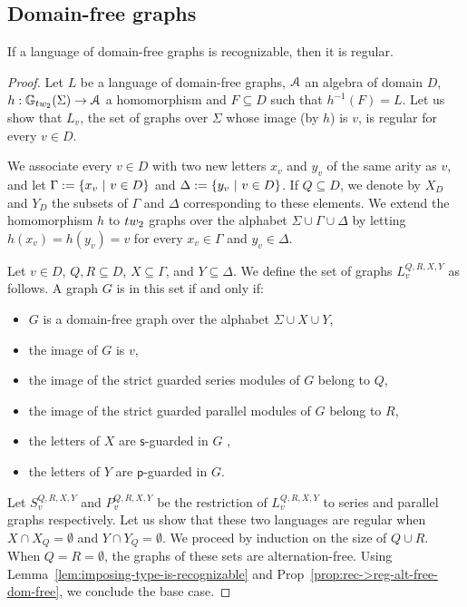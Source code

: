 \subsection{Domain-free graphs}
 



\begin{proposition}\label{prop:rec->reg-dom-free}
If a language of domain-free graphs is recognizable, then it is regular.
\end{proposition}
\begin{proof}
Let $L$ be a language of domain-free graphs, $\mathcal A$ an algebra of domain $D$, $h:\mathbb{G}_\TWT(\Sigma) \to \A$ a homomorphism and $F\subseteq D$ such that $h^{-1}(F)=L$. Let us show that $L_v$, the set of graphs over $\Sigma$ whose image (by $h$) is $v$,  is regular for every $v\in D$. 
\medskip

We associate every $v\in D$ with two new letters $x_v$ and $y_v$ of the same arity as $v$, and let  $\Gamma:=\left\{x_v\ | \ v\in D\right\}$ and $\Delta:=\left\{y_v\ | \ v\in D\right\}$. If $Q\subseteq D$, we denote by $X_D$ and $Y_D$ the subsets of $\Gamma$ and $\Delta$ corresponding to these elements.   We extend the homomorphism $h$ to $\TWT$ graphs over the alphabet $\Sigma \cup \Gamma \cup \Delta$ by letting $h(x_v)=h(y_v)=v$ for every $x_v\in\Gamma$ and $y_v\in\Delta$.
\medskip

Let $v\in D$, $Q, R\subseteq D$, $X\subseteq \Gamma$, and $Y\subseteq \Delta$.  We define the set of graphs $L^{Q,R,X,Y}_{v}$ as follows. A graph  $G$ is in this set if and only if:

\begin{itemize}
\item $G$ is a domain-free graph over the alphabet $\Sigma\cup X\cup Y$, 
\item the image of $G$ is $v$,
\item  the image of the strict guarded series modules of $G$ belong to $Q$, 
\item   the image of the strict guarded parallel modules of $G$ belong to $R$, 
\item the letters of $X$ are $\mathsf{s}$-guarded  in $G$ ,
\item the letters of $Y$ are $\mathsf{p}$-guarded in $G$.  
\end{itemize}
\smallskip

 Let $S^{Q,R,X,Y}_{v}$ and $P^{Q,R,X,Y}_{v}$ be the restriction of $L^{Q,R,X,Y}_{v}$ to series and parallel graphs respectively. Let us show that these two languages are regular  when $X\cap X_Q=\emptyset$ and $Y\cap Y_Q=\emptyset$. We proceed by induction on the size of $Q\cup R$. When $Q=R=\emptyset$, the graphs of these sets are   alternation-free. Using Lemma~\ref{lem:imposing-type-is-recognizable} and Prop~\ref{prop:rec->reg-alt-free-dom-free}, we conclude the base case. 
 \medskip
 

\end{proof}
